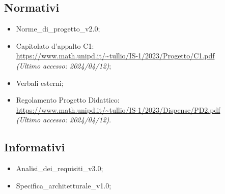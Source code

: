 \subsection{Normativi}
\begin{itemize}
    \item Norme\_di\_progetto\_v2.0;
    \item Capitolato d'appalto C1: \\ \url{https://www.math.unipd.it/~tullio/IS-1/2023/Progetto/C1.pdf} \\ \textit{(Ultimo accesso: 2024/04/12)};
    \item Verbali esterni;
    \item Regolamento Progetto Didattico: \\
    \url{https://www.math.unipd.it/~tullio/IS-1/2023/Dispense/PD2.pdf} \\ \textit{(Ultimo accesso: 2024/04/12)}.
\end{itemize}

\subsection{Informativi}
\begin{itemize}
    \item Analisi\_dei\_requisiti\_v3.0;
    \item Specifica\_architetturale\_v1.0;
\end{itemize}
